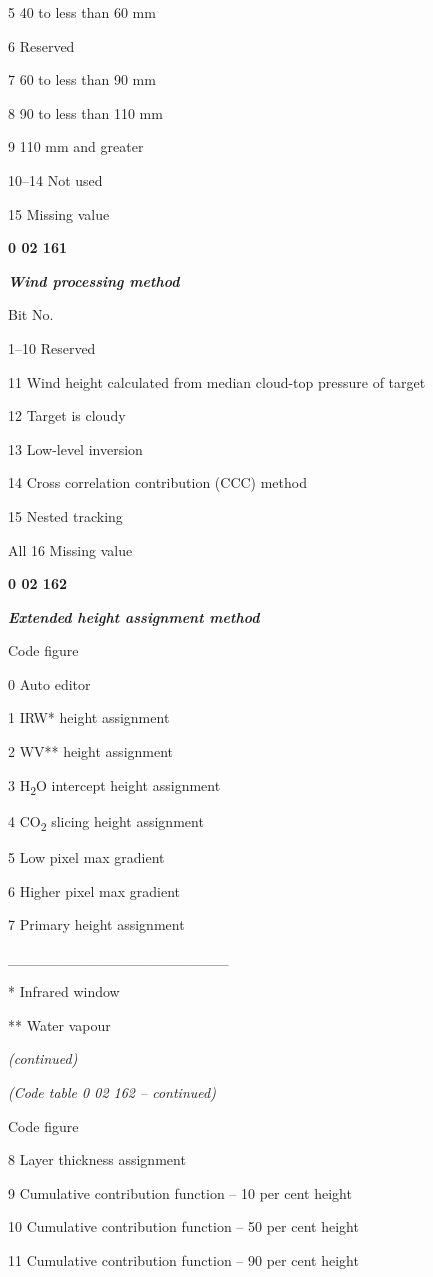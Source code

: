 5 40 to less than 60 mm

6 Reserved

7 60 to less than 90 mm

8 90 to less than 110 mm

9 110 mm and greater

10--14 Not used

15 Missing value

\textbf{0 02 161}

\emph{\textbf{Wind processing method}}

Bit No.

1--10 Reserved

11 Wind height calculated from median cloud-top pressure of target

12 Target is cloudy

13 Low-level inversion

14 Cross correlation contribution (CCC) method

15 Nested tracking

All 16 Missing value

\textbf{0 02 162}

\emph{\textbf{Extended height assignment method}}

Code figure

0 Auto editor

1 IRW* height assignment

2 WV** height assignment

3 H\textsubscript{2}O intercept height assignment

4 CO\textsubscript{2} slicing height assignment

5 Low pixel max gradient

6 Higher pixel max gradient

7 Primary height assignment

\_\_\_\_\_\_\_\_\_\_\_\_\_\_\_\_\_\_\_\_\_

* Infrared window

** Water vapour

\emph{(continued)}

\emph{(Code table 0 02 162 -- continued)}

Code figure

8 Layer thickness assignment

9 Cumulative contribution function -- 10 per cent height

10 Cumulative contribution function -- 50 per cent height

11 Cumulative contribution function -- 90 per cent height

